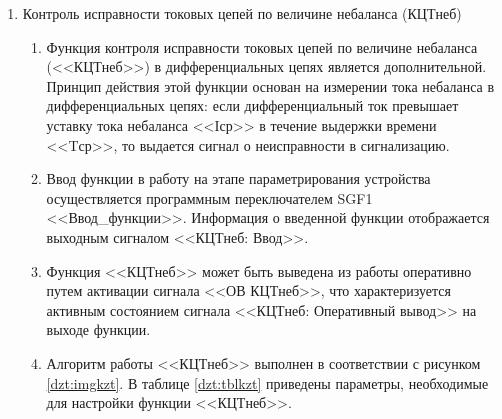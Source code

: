 \documentclass[a4paper, 12pt,table, hidelinks, DIV=calc]{extarticle} %
\begin{document}
\begin{enumerate}[label=\arabic{section}.\arabic{subsection}.\arabic{enumi}, labelsep=4pt, leftmargin=0pt, itemindent=57pt, itemsep=0pt, parsep=5pt]
\begin{enumerate}[label=\arabic{section}.\arabic{subsection}.\arabic{enumi}.\arabic*, labelsep=4pt, leftmargin=0em, itemindent=65pt, parsep=0pt]
\end{enumerate}


\item Контроль исправности токовых цепей по величине небаланса (КЦТнеб)

\begin{enumerate}[label=\arabic{section}.\arabic{subsection}.\arabic{enumi}.\arabic*, labelsep=4pt, leftmargin=0em, itemindent=65pt, parsep=0pt]

\item
Функция контроля исправности токовых цепей по величине небаланса (<<КЦТнеб>>) в дифференциальных цепях является дополнительной. Принцип действия этой функции основан на измерении тока небаланса в дифференциальных цепях: если дифференциальный ток превышает уставку тока небаланса <<Iср>> в течение выдержки времени <<Tср>>, то выдается сигнал о неисправности в сигнализацию.
\item
Ввод функции в работу на этапе параметрирования устройства осуществляется программным переключателем SGF1 <<Ввод\_функции>>. Информация о введенной функции отображается выходным сигналом <<КЦТнеб: Ввод>>.
\item
Функция <<КЦТнеб>> может быть выведена из работы оперативно путем активации сигнала <<ОВ КЦТнеб>>, что характеризуется активным состоянием сигнала <<КЦТнеб: Оперативный вывод>> на выходе функции. 
\item
Алгоритм работы <<КЦТнеб>> выполнен в соответствии с рисунком \ref{dzt:imgkzt}. В таблице \ref{dzt:tblkzt} приведены параметры, необходимые для настройки функции <<КЦТнеб>>.


\end{enumerate}
\end{enumerate}
\end{document}

